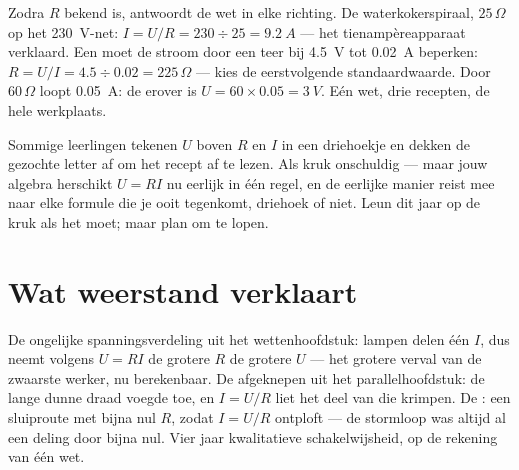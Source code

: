 \begin{example}\label{ex:g8:ohms-law:compute}
Zodra $R$ bekend is, antwoordt de wet in elke richting. De
waterkokerspiraal, $25\,\Omega$ op het \qty{230}{V}-net: $I = U/R = 230
\div 25 = \qty{9.2}{A}$ --- het tienampèreapparaat verklaard.
Een  moet de stroom door een teer  bij
\qty{4.5}{V} tot \qty{0.02}{A} beperken: $R = U/I = 4.5 \div 0.02 =
225\,\Omega$ --- kies de eerstvolgende standaardwaarde. Door
$60\,\Omega$ loopt \qty{0.05}{A}: de  erover is $U = 60
\times 0.05 = \qty{3}{V}$. Eén wet, drie recepten, de hele werkplaats.
\end{example}

\begin{remark}[De driehoekkruk]\label{rem:g8:ohms-law:triangle}
Sommige leerlingen tekenen $U$ boven $R$ en $I$ in een driehoekje en
dekken de gezochte letter af om het recept af te lezen. Als kruk
onschuldig --- maar jouw algebra herschikt $U = R I$ nu eerlijk in één
regel, en de eerlijke manier reist mee naar elke formule die je ooit
tegenkomt, driehoek of niet. Leun dit jaar op de kruk als het moet;
maar plan om te lopen.
\end{remark}

\section{Wat weerstand verklaart}

\begin{example}\label{ex:g8:ohms-law:mysteries}
De ongelijke spanningsverdeling uit het wettenhoofdstuk: lampen
 delen één $I$, dus neemt volgens $U = R I$ de grotere $R$ de
grotere $U$ --- het grotere verval van de zwaarste werker, nu
berekenbaar. De afgeknepen  uit het parallelhoofdstuk: de
lange dunne draad voegde  toe, en $I = U/R$ liet het
deel van die  krimpen. De : een
sluiproute met bijna nul $R$, zodat $I = U/R$ ontploft --- de stormloop
was altijd al een deling door bijna nul. Vier jaar kwalitatieve
schakelwijsheid, op de rekening van één wet.
\end{example}

